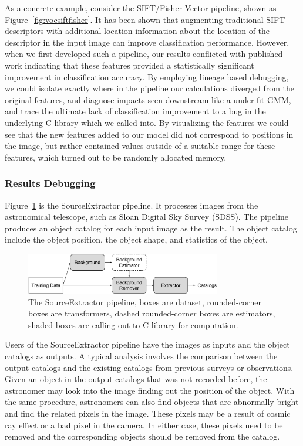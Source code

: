 \documentclass{sig-alternate}
\begin{document}
As a concrete example, consider the SIFT/Fisher Vector pipeline, shown as Figure~\ref{fig:vocsiftfisher}. 
It has been shown that augmenting traditional SIFT descriptors with additional location information about the location of the descriptor in the input image can improve classification performance.
However, when we first developed such a pipeline, our results conflicted with published work indicating that these features provided a statistically significant improvement in classification accuracy.
By employing lineage based debugging, we could isolate exactly where in the pipeline our calculations diverged from the original features, and diagnose impacts seen downstream like a under-fit GMM, and trace the ultimate lack of classification improvement to a bug in the underlying C library which we called into.
By visualizing the features we could see that the new features added to our model did not correspond to positions in the image, but rather contained values outside of a suitable range for these features, which turned out to be randomly allocated memory.


\subsubsection{Results Debugging}
Figure~\ref{fig:sourceextractor} is the SourceExtractor pipeline. 
It processes images from the astronomical telescope, such as Sloan Digital Sky Survey (SDSS).
The pipeline produces an object catalog for each input image as the result. 
The object catalog include the object position, the object shape, and statistics of the object.

\begin{figure}[h]
\begin{center}
    \includegraphics[width=85mm]{pictures/SourceExtractor}
    \caption {The SourceExtractor pipeline, boxes are dataset, rounded-corner boxes are transformers, dashed rounded-corner boxes are estimators, shaded boxes are calling out to C library for computation.
    \label{fig:sourceextractor}
}
\end{center}
\end{figure}

Users of the SourceExtractor pipeline have the images as inputs and the object catalogs as outputs.
A typical analysis involves the comparison between the output catalogs and the existing catalogs from previous surveys or observations.
Given an object in the output catalogs that was not recorded before, the astronomer may look into the image finding out the
position of the object.
With the same procedure, astronomers can also find objects that are abnormally bright and find the related pixels in the image.
These pixels may be a result of cosmic ray effect or a bad pixel in the camera. 
In either case, these pixels need to be removed and the corresponding objects should be removed from the catalog.
\end{document}
